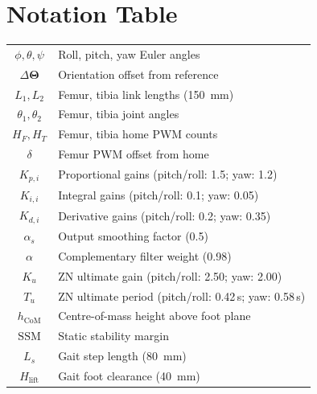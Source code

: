 \documentclass[journal]{IEEEtran}
\newcommand{\vect}[1]{\boldsymbol{#1}}
\begin{document}
\section{Notation Table}
\label{app:notation}
\begin{center}
\begin{tabular}{cl}
\toprule
$\phi,\theta,\psi$   & Roll, pitch, yaw Euler angles \\
$\Delta\vect{\Theta}$& Orientation offset from reference \\
$L_1, L_2$          & Femur, tibia link lengths (\SI{150}{\milli\metre}) \\
$\theta_1, \theta_2$ & Femur, tibia joint angles \\
$H_F, H_T$          & Femur, tibia home PWM counts \\
$\delta$             & Femur PWM offset from home \\
$K_{p,i}$           & Proportional gains (pitch/roll: 1.5; yaw: 1.2) \\
$K_{i,i}$           & Integral gains (pitch/roll: 0.1; yaw: 0.05) \\
$K_{d,i}$           & Derivative gains (pitch/roll: 0.2; yaw: 0.35) \\
$\alpha_s$          & Output smoothing factor (0.5) \\
$\alpha$            & Complementary filter weight (0.98) \\
$K_u$               & ZN ultimate gain (pitch/roll: 2.50; yaw: 2.00) \\
$T_u$               & ZN ultimate period (pitch/roll: 0.42\,s; yaw: 0.58\,s) \\
$h_\text{CoM}$      & Centre-of-mass height above foot plane \\
$\text{SSM}$        & Static stability margin \\
$L_s$               & Gait step length (\SI{80}{\milli\metre}) \\
$H_\text{lift}$     & Gait foot clearance (\SI{40}{\milli\metre}) \\
\bottomrule
\end{tabular}
\end{center}
\end{document}

